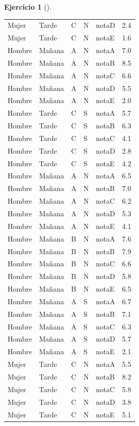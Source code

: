 \documentclass[
  a4paper,
]{scrreport}
\theoremstyle{definition}
\newtheorem{exercise}{Ejercicio}[chapter]
\theoremstyle{remark}
\begin{document}
\begin{exercise}[]
\begin{enumerate}
\begin{tcolorbox}
\begin{longtable}[]{@{}lllllr@{}}
  Mujer & Tarde & C & N & notaD & 2.4 \\
  Mujer & Tarde & C & N & notaE & 1.6 \\
  Hombre & Mañana & A & N & notaA & 7.0 \\
  Hombre & Mañana & A & N & notaB & 8.5 \\
  Hombre & Mañana & A & N & notaC & 6.6 \\
  Hombre & Mañana & A & N & notaD & 5.5 \\
  Hombre & Mañana & A & N & notaE & 2.0 \\
  Hombre & Tarde & C & S & notaA & 5.7 \\
  Hombre & Tarde & C & S & notaB & 6.3 \\
  Hombre & Tarde & C & S & notaC & 4.1 \\
  Hombre & Tarde & C & S & notaD & 2.8 \\
  Hombre & Tarde & C & S & notaE & 4.2 \\
  Hombre & Mañana & A & N & notaA & 6.5 \\
  Hombre & Mañana & A & N & notaB & 7.0 \\
  Hombre & Mañana & A & N & notaC & 6.2 \\
  Hombre & Mañana & A & N & notaD & 5.3 \\
  Hombre & Mañana & A & N & notaE & 4.1 \\
  Hombre & Mañana & B & N & notaA & 7.6 \\
  Hombre & Mañana & B & N & notaB & 7.9 \\
  Hombre & Mañana & B & N & notaC & 6.6 \\
  Hombre & Mañana & B & N & notaD & 5.8 \\
  Hombre & Mañana & B & N & notaE & 6.5 \\
  Hombre & Mañana & A & S & notaA & 6.7 \\
  Hombre & Mañana & A & S & notaB & 7.1 \\
  Hombre & Mañana & A & S & notaC & 6.3 \\
  Hombre & Mañana & A & S & notaD & 5.7 \\
  Hombre & Mañana & A & S & notaE & 2.1 \\
  Mujer & Tarde & C & N & notaA & 5.5 \\
  Mujer & Tarde & C & N & notaB & 8.2 \\
  Mujer & Tarde & C & N & notaC & 5.8 \\
  Mujer & Tarde & C & N & notaD & 3.8 \\
  Mujer & Tarde & C & N & notaE & 5.1 \\

\end{longtable}
\end{tcolorbox}
\end{enumerate}
\end{exercise}
\end{document}

